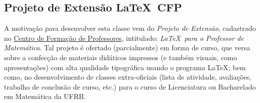 \subsection{Projeto de Extensão \LaTeX\ CFP}
%
A motivação para desenvolver esta classe vem do \emph{Projeto de Extensão}, 
cadastrado no 
\href{https://www.ufrb.edu.br/cfp/}{Centro de Formação de Professores},
intitulado: \emph{\LaTeX\ para o Professor de Matemática}.
Tal projeto é ofertado (parcialmente) em forma de curso, que versa sobre a 
confecção de materiais didáticos impressos (e também visuais, como
apresentações) com alta qualidade tipográfica usando o programa \LaTeX; bem 
como, no desenvolvimento de classes extra-oficiais (lista de atividade, 
avaliações, trabalho de conclusão de curso, etc.) para o curso de Licenciatura
ou Bacharelado em Matemática da UFRB.